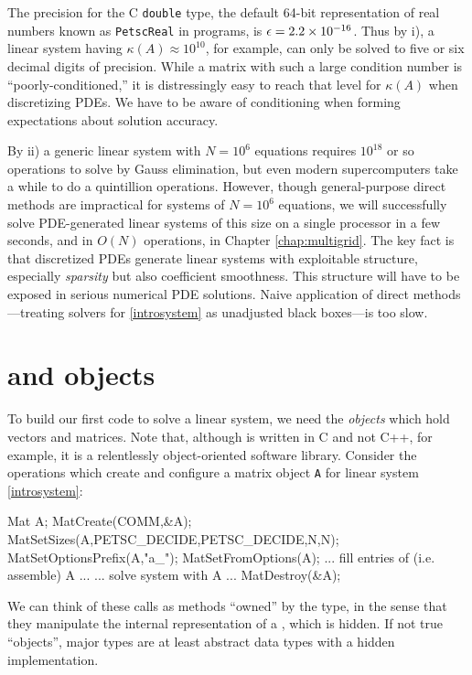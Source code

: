 The precision for the C \texttt{double} type, the default 64-bit representation of real numbers known as \texttt{PetscReal} in \PETSc programs, is $\epsilon = 2.2 \times 10^{-16}$.  Thus by i), a linear system having $\kappa(A) \approx 10^{10}$, for example, can only be solved to five or six decimal digits of precision.  While a matrix with such a large condition number is ``poorly-conditioned,'' it is distressingly easy to reach that level for $\kappa(A)$ when discretizing PDEs.  We have to be aware of conditioning when forming expectations about solution accuracy.

By ii) a generic linear system with $N=10^6$ equations requires $10^{18}$ or so operations to solve by Gauss elimination, but even modern supercomputers take a while to do a quintillion operations.  However, though general-purpose direct methods are impractical for systems of $N=10^6$ equations, we will successfully solve PDE-generated linear systems of this size on a single processor in a few seconds, and in $O(N)$ operations, in Chapter \ref{chap:multigrid}.  The key fact is that discretized PDEs generate linear systems with exploitable structure, especially \emph{sparsity} but also coefficient smoothness.  This structure will have to be exposed in serious numerical PDE solutions.  Naive application of direct methods---treating solvers for \eqref{introsystem} as unadjusted black boxes---is too slow.


\section{\PETSc \pVec and \pMat objects}

To build our first \PETSc code to solve a linear system, we need the \emph{objects} which hold vectors and matrices.  Note that, although \PETSc is written in C and not C++, for example, it is a relentlessly object-oriented software library.  Consider the operations which create and configure a matrix object \texttt{A} for linear system \eqref{introsystem}:
\begin{code}
Mat A;
MatCreate(COMM,&A);
MatSetSizes(A,PETSC_DECIDE,PETSC_DECIDE,N,N);
MatSetOptionsPrefix(A,"a_");
MatSetFromOptions(A);
... fill entries of (i.e. assemble) A ...
... solve system with A ...
MatDestroy(&A);
\end{code}
We can think of these calls as methods ``owned'' by the \pMat type, in the sense that they manipulate the internal representation of a \pMat, which is hidden.  If not true ``objects'', major \PETSc types are at least abstract data types with a hidden implementation.

